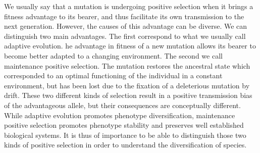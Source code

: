 \documentclass{article}
\begin{document}
    We usually say that a mutation is undergoing positive selection when it brings a fitness advantage to its bearer, and thus facilitate its own transmission to the next generation.
    However, the causes of this advantage can be diverse.
    We can distinguish two main advantages.
    The first correspond to what we usually call adaptive evolution.
    he advantage in fitness of a new mutation allows its bearer to become better adapted to a changing environment.
    The second we call maintenance positive selection.
    The mutation restores the ancestral state which corresponded to an optimal functioning of the individual in a constant environment, but has been lost due to the fixation of a deleterious mutation by drift.
    These two different kinds of selection result in a positive transmission bias of the advantageous allele, but their consequences are conceptually different.
    While adaptive evolution promotes phenotype diversification, maintenance positive selection promotes phenotype stability and preserves well established biological systems.
    It is thus of importance to be able to distinguish those two kinds of positive selection in order to understand the diversification of species.
\end{document}
